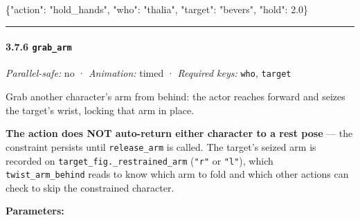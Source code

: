 \documentclass[
  11pt,
]{book}
\newenvironment{Shaded}{}{}
\newcommand{\DataTypeTok}[1]{\textcolor[rgb]{0.56,0.13,0.00}{#1}}
\newcommand{\FloatTok}[1]{\textcolor[rgb]{0.25,0.63,0.44}{#1}}
\newcommand{\FunctionTok}[1]{\textcolor[rgb]{0.02,0.16,0.49}{#1}}
\newcommand{\StringTok}[1]{\textcolor[rgb]{0.25,0.44,0.63}{#1}}
\begin{document}
\begin{Shaded}
\begin{Highlighting}[]
\FunctionTok{\{}\DataTypeTok{"action"}\FunctionTok{:} \StringTok{"hold\_hands"}\FunctionTok{,} \DataTypeTok{"who"}\FunctionTok{:} \StringTok{"thalia"}\FunctionTok{,} \DataTypeTok{"target"}\FunctionTok{:} \StringTok{"bevers"}\FunctionTok{,} \DataTypeTok{"hold"}\FunctionTok{:} \FloatTok{2.0}\FunctionTok{\}}
\end{Highlighting}
\end{Shaded}

\begin{center}\rule{0.5\linewidth}{0.5pt}\end{center}

\paragraph{\texorpdfstring{3.7.6
\texttt{grab\_arm}}{3.7.6 grab\_arm}}\label{grab_arm}

\emph{Parallel-safe:} no · \emph{Animation:} timed · \emph{Required
keys:} \texttt{who}, \texttt{target}

Grab another character's arm from behind: the actor reaches forward and
seizes the target's wrist, locking that arm in place.

\textbf{The action does NOT auto-return either character to a rest pose}
--- the constraint persists until \texttt{release\_arm} is called. The
target's seized arm is recorded on
\texttt{target\_fig.\_restrained\_arm} (\texttt{"r"} or \texttt{"l"}),
which \texttt{twist\_arm\_behind} reads to know which arm to fold and
which other actions can check to skip the constrained character.

\textbf{Parameters:}
\end{document}
